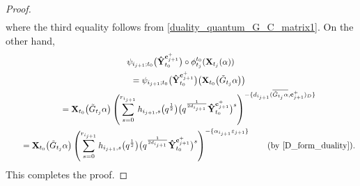 \documentclass[10pt,a4paper]{amsart}
\numberwithin{equation}{section}
\begin{document}
\begin{proof}
\begin{gather*}
 \end{gather*}
 where the third equality follows from \eqref{duality_quantum_G_C_matrix1}.
 On the other hand,
 \begin{gather*}
 \psi_{i_{j+1};t_{0}}\bigl(\mathbf{\hat{Y}}_{t_{0}}^{\mathbf{c}_{j+1}^{+}}\bigr)\circ\phi_{t_{j}}^{t_{0}}(\mathbf{X}_{t_{j}}(\alpha))\\
\qquad =\psi_{i_{j+1};t_{0}}\bigl(\mathbf{\hat{Y}}_{t_{0}}^{\mathbf{c}_{j+1}^{+}}\bigr)\bigl(\mathbf{X}_{t_{0}}\bigl(\tilde{G}_{t_{j}}\alpha\bigr)\bigr)\\
\qquad =\mathbf{X}_{t_{0}}\bigl(\tilde{G}_{t_{j}}\alpha\bigr)\left(\sum\limits_{s=0}^{r_{i_{j+1}}} h_{i_{j+1},s}\bigl(q^{\frac{1}{2}}\bigr)\bigl(q^{\frac{1}{2d_{i_{j+1}}}}\mathbf{\hat{Y}}_{t_{0}}^{\mathbf{c}_{j+1}^{+}}\bigr)^{s}\right)^{-\{d_{i_{j+1}}(\overline{\tilde{G}_{t_{j}}\alpha},\mathbf{c}_{j+1}^{+})_D\}}\\
\qquad =\mathbf{X}_{t_{0}}\bigl(\tilde{G}_{t_{j}}\alpha\bigr)\left(\sum\limits_{s=0}^{r_{i_{j+1}}} h_{i_{j+1},s}\bigl(q^{\frac{1}{2}}\bigr)\bigl(q^{\frac{1}{2d_{i_{j+1}}}}\mathbf{\hat{Y}}_{t_{0}}^{\mathbf{c}_{j+1}^{+}}\bigr)^{s}\right)^{-\{\alpha_{i_{j+1}}\varepsilon_{j+1}\}}\qquad\text{(by \eqref{D_form_duality})}.
 \end{gather*}
 This completes the proof.
\end{proof}
\end{document}
